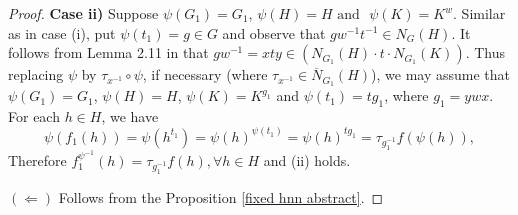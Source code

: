 \documentclass[a4paper,12pt]{article}
\newtheorem{lem}[thm]{Lemma}
\newtheorem{prop}[thm]{Proposition}
\def\OE{{\rm OE}}
\def\hnn {{\rm HNN}}
\begin{document}
{\begin{proof}
 
 \textbf{ Case ii)} Suppose $\psi(G_1) = G_1$,  $\psi(H)=H \mbox{ and }$ $\psi(K)=K^{w}$. Similar as in case (i), put $\psi(t_1) = g \in G$ and observe that $gw^{-1}t^{-1}\in N_{G}(H)$. It follows from Lemma 2.11 in \cite{BZ} that $g w^{-1}=xty \in \left( N_{G_1}(H) \cdot t \cdot N_{G_1}(K) \right)$. Thus replacing $\psi$ by $\tau_{x^{-1}} \circ \psi$, if necessary (where $\tau_{x^{-1}} \in \overline{N}_{G_1}(H)$), we may assume that $\psi(G_1)=G_1$, $\psi(H)=H$, $\psi(K)=K^{g_1}$ and $\psi(t_1)=tg_1$, where $g_1=ywx.$ %
 For each $h \in H$, we have$$\psi(f_1(h))=\psi(h^{t_1})=\psi(h)^{\psi(t_1)}=\psi(h)^{tg_1}=\tau_{g_1^{-1}} f(\psi(h)),$$
 Therefore $f_1^{\psi^{-1}}(h)= \tau_{g_1^{-1}} f(h), \forall h \in H$ and (ii) holds. 
 

$(\Leftarrow)$ Follows from the Proposition \ref{fixed hnn abstract}. %

\end{proof} 





}
\end{document}
